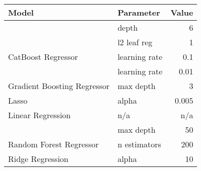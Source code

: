 
\begin{tabular}[t]{llr}
\toprule
\multicolumn{1}{l}{Model} & \multicolumn{1}{l}{Parameter} & \multicolumn{1}{l}{Value}\\
\midrule
 & depth & 6\\

 & l2 leaf reg & 1\\

\multirow[t]{-3}{*}{\raggedright\arraybackslash CatBoost Regressor} & learning rate & 0.1\\
\cmidrule(lr){1-3}

 & learning rate & 0.01\\

\multirow[t]{-2}{*}{\raggedright\arraybackslash Gradient Boosting Regressor} & max depth & 3\\
\cmidrule(lr){1-3}

Lasso & alpha & 0.005\\
\cmidrule(lr){1-3}

Linear Regression & n/a & n/a\\
\cmidrule(lr){1-3}

 & max depth & 50\\

\multirow[t]{-2}{*}{\raggedright\arraybackslash Random Forest Regressor} & n estimators & 200\\
\cmidrule(lr){1-3}

Ridge Regression & alpha & 10\\
\bottomrule
\end{tabular}
